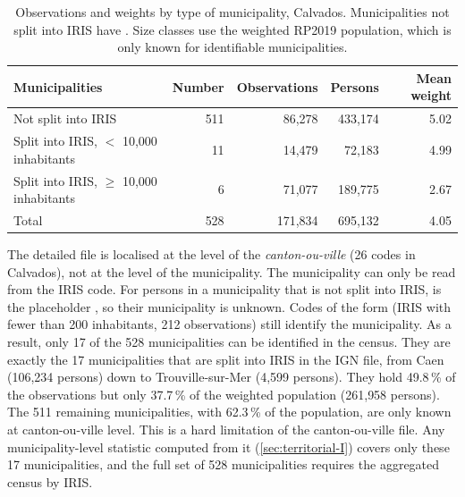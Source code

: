 \begin{table}[H]
  \centering
  \caption{Observations and weights by type of municipality, Calvados. Municipalities not split into IRIS have
  . Size classes use the weighted RP2019 population, which is only known for identifiable
  municipalities.}
  \label{tab:study-area-weights}
  \begin{tabular}{@{}lrrrr@{}}
    \toprule
    Municipalities & Number & Observations & Persons & Mean weight \\
    \midrule
    Not split into IRIS & 511 & 86{,}278 & 433{,}174 & 5.02 \\
    Split into IRIS, $<$ 10{,}000 inhabitants & 11 & 14{,}479 & 72{,}183 & 4.99 \\
    Split into IRIS, $\geq$ 10{,}000 inhabitants & 6 & 71{,}077 & 189{,}775 & 2.67 \\
    \midrule
    Total & 528 & 171{,}834 & 695{,}132 & 4.05 \\
    \bottomrule
  \end{tabular}
\end{table}

The detailed file is localised at the level of the \emph{canton-ou-ville} (26 codes  in Calvados), not
at the level of the municipality. The municipality can only be read from the IRIS code. For persons in a municipality
that is not split into IRIS,  is the placeholder , so their municipality is unknown. Codes of
the form  (IRIS with fewer than 200 inhabitants, 212 observations) still identify the municipality.
As a result, only 17 of the 528 municipalities can be identified in the census. They are exactly the 17 municipalities
that are split into IRIS in the IGN file, from Caen (106{,}234 persons) down to Trouville-sur-Mer (4{,}599 persons).
They hold 49.8\,\% of the observations but only 37.7\,\% of the weighted population (261{,}958 persons). The 511
remaining municipalities, with 62.3\,\% of the population, are only known at canton-ou-ville level. This is a hard
limitation of the canton-ou-ville file. Any municipality-level statistic computed from it (\cref{sec:territorial-I})
covers only these 17 municipalities, and the full set of 528 municipalities requires the aggregated census by IRIS.

